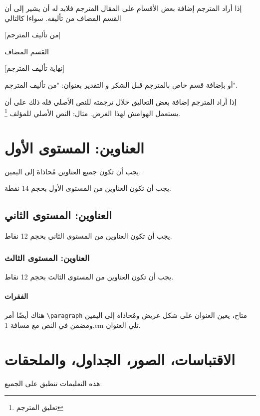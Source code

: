 \documentclass[12pt]{article}
\begin{document}
 إذا أراد المترجم إضافة بعض الأقسام على المقال المترجم فلابد له أن يشير إلى أن القسم المضاف من تأليفه. 
سواءا كالتالي

[من تأليف المترجم] 

القسم المضاف

[نهاية تأليف المترجم] 

أو بإضافة قسم خاص بالمترجم قبل الشكر و التقدير بعنوان: "من تأليف المترجم". 

 إذا أراد المترجم إضافة بعض التعاليق خلال ترجمته للنص الأصلي فله ذلك على أن يستعمل الهوامش لهذا الغرض.
مثال:
النص الأصلي للمؤلف \footnote{تعليق المترجم}.

\section{العناوين: المستوى الأول}
\label{headings}

يجب أن تكون جميع العناوين مُحاذاة إلى اليمين.

يجب أن تكون العناوين من المستوى الأول بحجم 14 نقطة.

\subsection{العناوين: المستوى الثاني}

يجب أن تكون العناوين من المستوى الثاني بحجم 12 نقاط.

\subsubsection{العناوين: المستوى الثالث}

يجب أن تكون العناوين من المستوى الثالث بحجم 12 نقاط.

\paragraph{الفقرات}

هناك أيضًا أمر \verb+\paragraph+ متاح، يعين العنوان على شكل عريض ومُحاذاة إلى اليمين ومضمن في النص مع مسافة 1,em تلي العنوان.

\section{الاقتباسات، الصور، الجداول، والملحقات}
\label{others}

هذه التعليمات تنطبق على الجميع.
\end{document}
